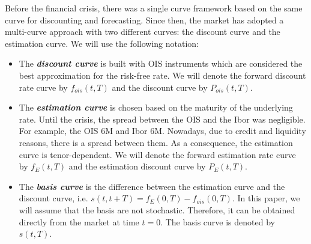 \documentclass[a4paper,10pt]{article}
\newcommand{\1}{\mathbf{1}}
\begin{document}

Before the financial crisis, there was a single curve framework based on the same curve for discounting and forecasting. Since then, the market has adopted a multi-curve approach with two different curves: the discount curve and the estimation curve. We will use the following notation:
\begin{itemize}
	\item The \textbf{\textit{discount curve}} is built with OIS instruments which are considered the best approximation for the risk-free rate. We will denote the forward discount rate curve by $f_{ois}(t,T)$ and the discount curve by $P_{ois}(t,T)$.

	\item The \textbf{\textit{estimation curve}} is chosen based on the maturity of the underlying rate. Until the crisis, the spread between the OIS and the Ibor was negligible. For example, the OIS 6M and Ibor 6M. Nowadays, due to credit and liquidity reasons, there is a spread between them. As a consequence, the estimation curve is tenor-dependent. We will denote the forward estimation rate curve by $f_{E}(t,T)$ and the estimation discount curve by $P_{E}(t,T)$. 
	
	\item The \textbf{\textit{basis curve}} is the difference between the estimation curve and the discount curve, i.e. $s(t,t+T)= f_{E}(0,T) - f_{ois}(0,T)$. In this paper, we will assume that the basis are not stochastic. Therefore, it can be obtained directly from the market at time $t=0$. The basis curve is denoted by $s(t,T)$.
	\end{itemize}
\end{document}
